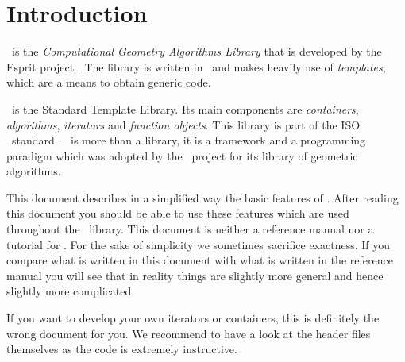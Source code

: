 

\cleardoublepage

\chapter{Introduction}

\cgal\ is the {\em Computational Geometry Algorithms Library} that is
developed by the {\sc Esprit} project \cgal.
The library is written in \CC\ and makes heavily use of {\em templates},
which are a means to obtain generic code.

\stl\  is the Standard Template Library. Its main components are {\em
containers}, {\em algorithms}, {\em iterators} and {\em function
objects}.  This library is part of the ISO \CC\ standard 
\cite{cgal:ansi-is14882-98}.
\stl\ is more than a library, it is a framework and a programming paradigm
which was adopted by the \cgal\ project for its library of geometric
algorithms.

This document describes in a simplified way the basic features of \stl.
After reading this document you should be able to use these features
which are used throughout the \cgal\ library.
This document is neither a reference manual nor a tutorial for \stl.
For the sake of simplicity we sometimes sacrifice exactness.
If you compare what is written in this document with what is written
in the reference manual you will see that in reality things are
slightly more general and hence slightly more complicated.

If you want to develop your own iterators or containers, this is 
definitely the wrong document for you.
We recommend to have a look at the header files themselves as the code is 
extremely instructive.
